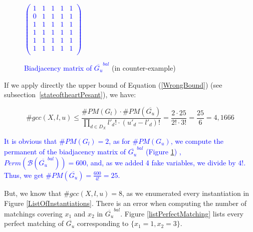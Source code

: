 \documentclass[jair,twoside,11pt,theapa]{article}
\newcommand{\minor}[1]{\textcolor{blue}{#1}}
\begin{document}
    \begin{figure}
    	\centering
     \vspace{1.8cm}
	\minor{	$
	\begin{pmatrix}
		1 & 1 & 1 & 1 & 1 \\
		0 & 1 & 1 & 1 & 1 \\
		1 & 1 & 1 & 1 & 1 \\
		1 & 1 & 1 & 1 & 1 \\
		1 & 1 & 1 & 1 & 1 \\
        1 & 1 & 1 & 1 & 1 \\
	\end{pmatrix}
		$ }
        \caption{\minor{Biadjacency matrix of $\overline{G_u}^{bal}$} (in counter-example)}
        \label{BiadjacencyCounterExample}
    \end{figure}
	
If we apply directly the upper bound of Equation (\ref{WrongBound}) (see subsection~\ref{stateoftheartPesant}), we have:
	
	\begin{equation*}
		\#gcc(X,l,u) \leq \frac{\#PM(G_l) \cdot \#PM(\overline{G_u})}{\prod_{d \in D_X} l'_d! \cdot (u'_d -l'_d)!} = \frac{2 \cdot 25}{2! \cdot 3!} = \frac{25}{6} = 4,1666
	\end{equation*}
    
\minor{It is obvious that $\#PM(G_l)=2$, as for $\#PM(G_u)$, we compute the permanent of the biadjacency matrix of $\overline{G_u}^{bal}$ (Figure \ref{BiadjacencyCounterExample}) , $Perm(\mathcal{B}(\overline{G_u}^{bal}))=600$, and, as we added 4 fake variables, we divide by $4!$. Thus, we get $\#PM(\overline{G_u})=\frac{600}{4!}=25$.}

But, we know that $\#gcc(X,l,u) = 8$, as we enumerated every instantiation in Figure \ref{ListOfInstantiations}. There is an error when computing the number of matchings covering $x_1$ and $x_2$ in $\overline{G_u}^{bal}$. Figure \ref{listPerfectMatching} lists every perfect matching of $\overline{G_u}$ corresponding to $\lbrace x_1 = 1, x_2=3 \rbrace$.
\end{document}
